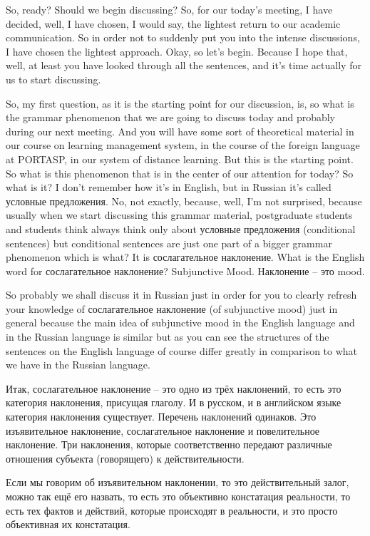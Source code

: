 \documentclass[main.tex]{subfiles}
\begin{document}
So, ready?
Should we begin discussing?
So, for our today's meeting, I have decided, well, I have chosen, I would say, the lightest return to our academic communication.
So in order not to suddenly put you into the intense discussions, I have chosen the lightest approach.
Okay, so let's begin.
Because I hope that, well, at least you have looked through all the sentences, and it's time actually for us to start discussing.

So, my first question, as it is the starting point for our discussion, is, so what is the grammar phenomenon that we are going to discuss today and probably during our next meeting.
And you will have some sort of theoretical material in our course on learning management system, in the course of the foreign language at PORTASP, in our system of distance learning.
But this is the starting point.
So what is this phenomenon that is in the center of our attention for today?
So what is it?
I don't remember how it's in English, but in Russian it's called условные предложения.
No, not exactly, because, well, I'm not surprised, because usually when we start discussing this grammar material, postgraduate students and students think always think only about условные предложения (conditional sentences) but conditional sentences are just one part of a bigger grammar phenomenon which is what?
It is сослагательное наклонение.
What is the English word for сослагательное наклонение?
Subjunctive Mood.
Наклонение -- это mood.

So probably we shall discuss it in Russian just in order for you to clearly refresh your knowledge of сослагательное наклонение (of subjunctive mood) just in general because the main idea of subjunctive mood in the English language and in the Russian language is similar but as you can see the structures of the sentences on the English language of course differ greatly in comparison to what we have in the Russian language.

Итак, сослагательное наклонение -- это одно из трёх наклонений, то есть это категория наклонения, присущая глаголу.
И в русском, и в английском языке категория наклонения существует.
Перечень наклонений одинаков.
Это изъявительное наклонение, сослагательное наклонение и повелительное наклонение.
Три наклонения, которые соответственно передают различные отношения субъекта (говорящего) к действительности.

Если мы говорим об изъявительном наклонении, то это действительный залог, можно так ещё его назвать, то есть это объективно констатация реальности, то есть тех фактов и действий, которые происходят в реальности, и это просто объективная их констатация.
\end{document}

